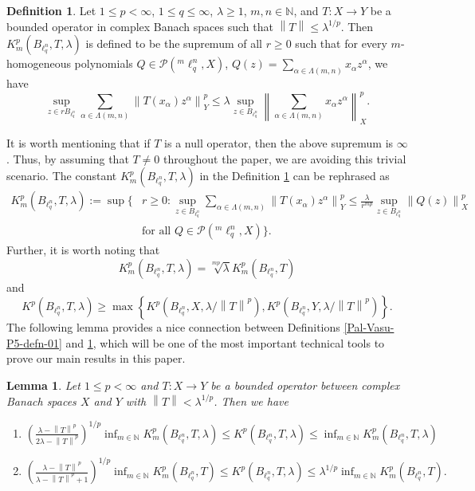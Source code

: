\documentclass[a4paper,12pt]{amsart}
\newtheorem{lem}[equation]{Lemma}
\theoremstyle{definition}
\newtheorem{defn}{Definition}[section]
\newcommand{\norm}[1]{\left\lVert#1\right\rVert}
\begin{document}
\begin{defn}\label{Pal-Vasu-P5-defn-02}
	Let $1\leq p<\infty$, $1\leq q\leq \infty$, $\lambda \geq 1$, $m,n \in \mathbb{N}$, and $T: X\rightarrow Y$ be a bounded operator in complex Banach spaces such that $\norm{T}\leq \lambda^{1/p}$. Then $K^p_m(B_{\ell^n_q},T,\lambda)$ is defined to be the supremum of all $r\geq 0$ such that for every $m$-homogeneous polynomials $Q\in \mathcal{P}(^m\ell^n_q, X)$, $Q(z)=\sum_{\alpha \in\Lambda(m,n)}x_{\alpha}z^{\alpha}$, we have 
	\begin{equation*}
		\sup_{z\in rB_{\ell^n_{q}}}\sum_{\alpha \in\Lambda(m,n)}\norm{T(x_{\alpha})z^{\alpha}}^{p}_{Y}\leq \lambda\sup_{z\in B_{\ell^n_{q}}}\norm{\sum_{\alpha \in\Lambda(m,n)}x_{\alpha}z^{\alpha}}^p_{X}.
	\end{equation*}
\end{defn}
It is worth mentioning that if $T$ is a null operator, then the above supremum is $\infty$. Thus, by assuming that $T\neq 0$ throughout the paper, we are avoiding this trivial scenario. The constant $K^p_m(B_{\ell^n_q},T,\lambda)$ in the Definition \ref{Pal-Vasu-P5-defn-02} can be rephrased as
\begin{align}\label{Pal-Vasu-P5-eqn-int-01}
	K^p_m(B_{\ell^n_q},T,\lambda):= \sup \biggl\{ & r\geq 0 : \sup_{z\in B_{\ell^n_{q}}}\sum_{\alpha \in\Lambda(m,n)}\norm{T(x_{\alpha})z^{\alpha}}^{p}_{Y}\leq \frac{\lambda}{r^{mp}}\sup_{z\in B_{\ell^n_{q}}}\norm{Q(z)}^p_{X}\\[2mm]\nonumber & \mbox{for all} \,\, Q\in \mathcal{P}(^m\ell^n_q, X)\biggr\}.
\end{align}
Further, it is worth noting that
\begin{equation}\label{Pal-Vasu-P5-eqn-int-02}
	K^p_m(B_{\ell^n_q},T,\lambda)=\sqrt[mp]{\lambda}K^p_m(B_{\ell^n_q},T)
\end{equation}
and 
\begin{equation}\label{Pal-Vasu-P5-eqn-int-03}
	K^p(B_{\ell^n_q},T,\lambda) \geq \max \left\{K^p\left(B_{\ell^n_q},X,\lambda/\norm{T}^p\right), K^p\left(B_{\ell^n_q},Y,\lambda/\norm{T}^p\right)\right\}.
\end{equation}
The following lemma provides a nice connection between Definitions \ref{Pal-Vasu-P5-defn-01} and \ref{Pal-Vasu-P5-defn-02}, which will be one of the most important technical tools to prove our main results in this paper.
\begin{lem}\label{Pal-Vasu-P5-Lemma-01}
	Let  $1\leq p<\infty$ and $T:X\rightarrow Y$ be a bounded operator between complex Banach spaces $X$ and $Y$ with $\norm{T}<\lambda^{1/p}$. Then we have 
	\begin{enumerate}
		\item[(a)] $\left(\frac{\lambda-\norm{T}^p}{2\lambda-\norm{T}^p}\right)^{1/p}\inf_{m\in \mathbb{N}}K^p_m(B_{\ell^n_q}, T, \lambda)\leq K^p(B_{\ell^n_q},T,\lambda)\leq \inf_{m\in \mathbb{N}}K^p_m(B_{\ell^n_q},T,\lambda)$
		\item[(b)] $\left(\frac{\lambda-\norm{T}^p}{\lambda-\norm{T}^p+1}\right)^{1/p}\inf_{m\in\mathbb{N}}K^p_m(B_{\ell^n_q},T)\leq K^p(B_{\ell^n_q},T,\lambda)\leq \lambda^{1/p} \inf_{m\in \mathbb{N}}K^p_m(B_{\ell^n_q},T).$
	\end{enumerate}
\end{lem}
\end{document}

